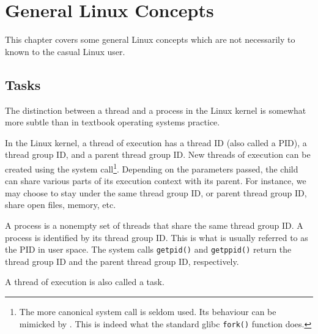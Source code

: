 
\chapter{General Linux Concepts}

This chapter covers some general Linux concepts which are not necessarily to
known to the casual Linux user.

\section{Tasks}

\label{appendix:general-linux-concepts:tasks}

The distinction between a thread and a process in the Linux kernel is somewhat
more subtle than in textbook operating systems practice.

In the Linux kernel, a thread of execution has a thread ID (also called a PID),
a thread group ID, and a parent thread group ID. New threads of execution can
be created using the \cite{man-2-clone} system call\footnote{The more canonical
\cite{man-2-fork} system call is seldom used. Its behaviour can be mimicked by
\cite{man-2-clone}. This is indeed what the standard glibc \texttt{fork()}
function does.}. Depending on the parameters passed, the child can share
various parts of its execution context with its parent. For instance, we may
choose to stay under the same thread group ID, or parent thread group ID, share
open files, memory, etc.

A process is a nonempty set of threads that share the same thread group ID. A
process is identified by its thread group ID. This is what is usually referred
to as the PID in user space. The system calls \texttt{getpid()} and
\texttt{getppid()} return the thread group ID and the parent thread group ID,
respectively.

A thread of execution is also called a task.
